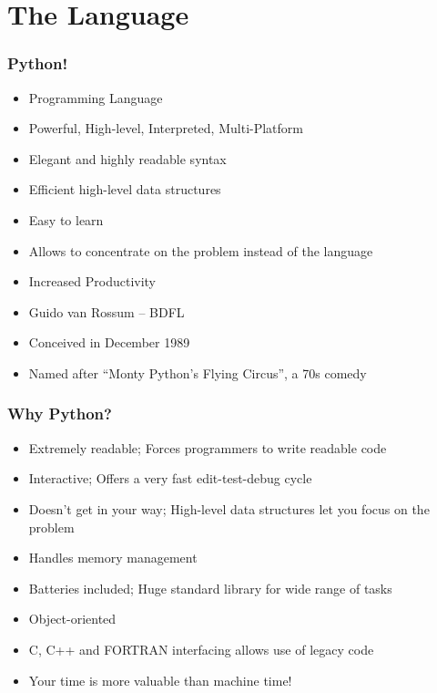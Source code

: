 \section{The Language}
\begin{frame}[fragile]
  \frametitle{Python!}
  \begin{itemize}
  \item Programming Language
  \item Powerful, High-level, Interpreted, Multi-Platform
  \item Elegant and highly readable syntax
  \item Efficient high-level data structures
  \end{itemize}
  \begin{itemize}
  \item Easy to learn
  \item Allows to concentrate on the problem instead of the language
  \item Increased Productivity
  \end{itemize}
  \begin{itemize}
  \item Guido van Rossum -- BDFL
  \item Conceived in December 1989
  \item Named after ``Monty Python's Flying Circus'', a 70s comedy
  \end{itemize}
\end{frame}

\begin{frame}[fragile]
  \frametitle{Why Python?}
  \begin{itemize}
  \item Extremely readable; Forces programmers to write readable code 
  \item Interactive; Offers a very fast edit-test-debug cycle
  \item Doesn't get in your way; High-level data structures let you
    focus on the problem
  \item Handles memory management
  \item Batteries included; Huge standard library for wide range of
    tasks
  \item Object-oriented
  \item C, C++ and FORTRAN interfacing allows use of legacy code
  \item Your time is more valuable than machine time!
  \end{itemize}
\end{frame}

